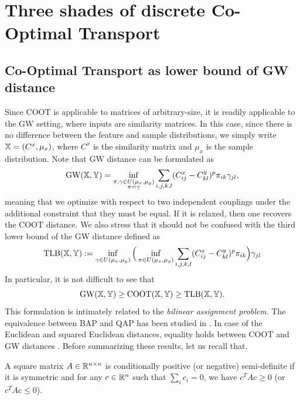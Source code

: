 \section{Three shades of discrete Co-Optimal Transport}

\subsection{Co-Optimal Transport as lower bound of GW distance} \label{subsec:GWLB}

Since COOT is applicable to matrices of arbitrary-size, it is readily applicable to the GW setting,
where inputs are similarity matrices. In this case, since there is no difference between
the feature and sample distributions, we simply write $\mathbb X = (C^x, \mu_x)$,
where $C^x$ is the similarity matrix and $\mu_x$ is the sample distribution.
Note that GW distance can be formulated as
\begin{align}
  \text{GW}(\mathbb X, \mathbb Y) =
  \inf_{\substack{\pi, \gamma \in U(\mu_x, \mu_y) \\ \pi = \gamma }}
  \sum_{i,j,k,l} (C^x_{ij} - C^y_{kl})^p \pi_{ik} \gamma_{jl},
\end{align}
meaning that we optimize with respect to two independent couplings
under the additional constraint that they must be equal. If it is relaxed, then
one recovers the COOT distance. We also stress that it should not
be confused with the third lower bound of the GW distance \citep{Memoli07,Memoli11} defined as
\begin{equation}
  \text{TLB}(\mathbb X, \mathbb Y) :=
  \inf_{\gamma \in U(\mu_x, \mu_y)}
  \Big( \inf_{\pi \in U(\mu_x, \mu_y)} \sum_{i,j,k,l} (C^x_{ij} - C^y_{kl})^p \pi_{ik} \Big)
  \gamma_{jl}
\end{equation}
In particular, it is not difficult to see that
\begin{equation}
  \label{gw_tlb_COOT}
  \text{GW}(\mathbb X, \mathbb Y) \geq \text{COOT}(\mathbb X, \mathbb Y)
  \geq \text{TLB}(\mathbb X, \mathbb Y).
\end{equation}
This formulation is intimately related to the \textit{bilinear assignment problem}.
The equivalence between BAP and QAP has been studied in \citep{Konno76}.
In case of the Euclidean and squared Euclidean distances, equality holds between
COOT and GW distances \citep{Sejourne20,Redko20}. Before summarizing these results,
let us recall that.
\begin{definition}
   A square matrix $A \in \mathbb R^{n \times n}$ is
  conditionally positive (or negative) semi-definite
  if it is symmetric and for any $c \in \mathbb R^n$ such that $\sum_i c_i = 0$, we have
  $c^T A c \geq 0$ (or $c^T A c \leq 0$).
\end{definition}

